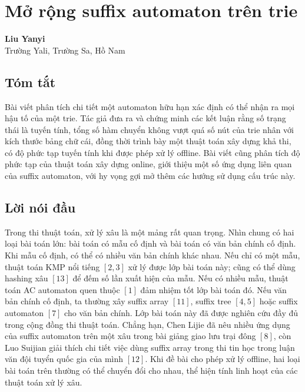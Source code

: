 \documentclass[11pt]{article}
\begin{document}
\section{Mở rộng suffix automaton trên trie}

\begin{center}
\textbf{Liu Yanyi}\\
Trường Yali, Trường Sa, Hồ Nam
\end{center}

\subsection*{Tóm tắt}

Bài viết phân tích chi tiết một automaton hữu hạn xác định có thể nhận ra mọi
hậu tố của một trie. Tác giả đưa ra và chứng minh các kết luận rằng số trạng
thái là tuyến tính, tổng số hàm chuyển không vượt quá số nút của trie nhân với
kích thước bảng chữ cái, đồng thời trình bày một thuật toán xây dựng khả thi,
có độ phức tạp tuyến tính khi được phép xử lý offline. Bài viết cũng phân tích
độ phức tạp của thuật toán xây dựng online, giới thiệu một số ứng dụng liên
quan của suffix automaton, với hy vọng gợi mở thêm các hướng sử dụng cấu trúc
này.

\subsection{Lời nói đầu}

Trong thi thuật toán, xử lý xâu là một mảng rất quan trọng. Nhìn chung có hai
loại bài toán lớn: bài toán có mẫu cố định và bài toán có văn bản chính cố
định. Khi mẫu cố định, có thể có nhiều văn bản chính khác nhau. Nếu chỉ có một
mẫu, thuật toán KMP nổi tiếng \([2,3]\) xử lý được lớp bài toán này; cũng có thể
dùng hashing xâu \([13]\) để đếm số lần xuất hiện của mẫu. Nếu có nhiều mẫu,
thuật toán AC automaton quen thuộc \([1]\) đảm nhiệm tốt lớp bài toán đó. Nếu
văn bản chính cố định, ta thường xây suffix array \([11]\), suffix tree \([4,5]\)
hoặc suffix automaton \([7]\) cho văn bản chính. Lớp bài toán này đã được nghiên
cứu đầy đủ trong cộng đồng thi thuật toán. Chẳng hạn, Chen Lijie đã nêu nhiều
ứng dụng của suffix automaton trên một xâu trong bài giảng giao lưu trại đông
\([8]\), còn Luo Suijian giải thích chi tiết việc dùng suffix array trong thi
tin học trong luận văn đội tuyển quốc gia của mình \([12]\). Khi đề bài cho
phép xử lý offline, hai loại bài toán trên thường có thể chuyển đổi cho nhau,
thể hiện tính linh hoạt của các thuật toán xử lý xâu.
\end{document}
